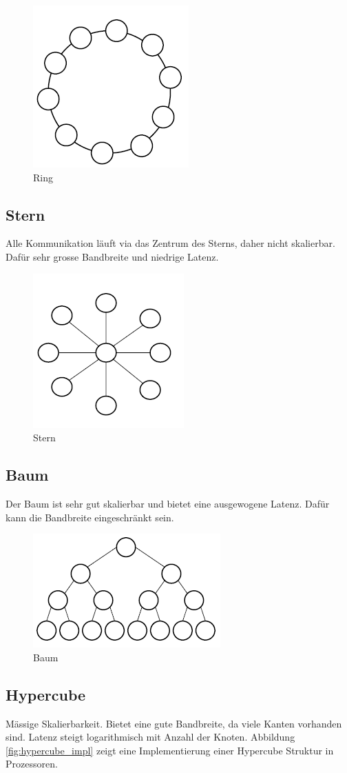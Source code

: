 \begin{figure}[h!]
	\centering
	\includegraphics[width=0.2\linewidth]{fig/ring}
	\caption{Ring}
	\label{fig:ring}
\end{figure}

\subsection{Stern}
Alle Kommunikation läuft via das Zentrum des Sterns, daher nicht skalierbar. Dafür sehr grosse Bandbreite und niedrige Latenz.

 \begin{figure}[h!]
\centering
\includegraphics[width=0.2\linewidth]{fig/stern}
\caption{Stern}
\label{fig:stern}
\end{figure}

\subsection{Baum}
Der Baum ist sehr gut skalierbar und bietet eine ausgewogene Latenz. Dafür kann die Bandbreite eingeschränkt sein.

\begin{figure}[h!]
	\centering
	\includegraphics[width=0.2\linewidth]{fig/baum}
	\caption{Baum}
	\label{fig:baum}
\end{figure}

\subsection{Hypercube}
Mässige Skalierbarkeit. Bietet eine gute Bandbreite, da viele Kanten vorhanden sind. Latenz steigt logarithmisch mit Anzahl der Knoten. Abbildung \ref{fig:hypercube_impl} zeigt eine Implementierung einer Hypercube Struktur in Prozessoren.

